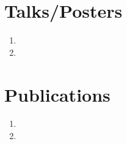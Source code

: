 \documentclass[a4paper,10pt]{article}
\begin{document}
\section{Talks/Posters}
\begin{enumerate}
\item {}
\item {}
\end{enumerate}
\section{Publications}
\begin{enumerate}
\item {}
\item {}
\end{enumerate}
\end{document}
